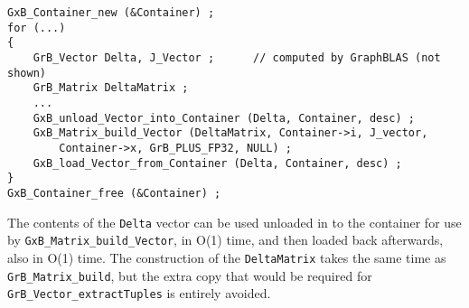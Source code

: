 {\footnotesize
\begin{verbatim}
GxB_Container_new (&Container) ;
for (...)
{
    GrB_Vector Delta, J_Vector ;      // computed by GraphBLAS (not shown)
    GrB_Matrix DeltaMatrix ;
    ...
    GxB_unload_Vector_into_Container (Delta, Container, desc) ;
    GxB_Matrix_build_Vector (DeltaMatrix, Container->i, J_vector,
        Container->x, GrB_PLUS_FP32, NULL) ;
    GxB_load_Vector_from_Container (Delta, Container, desc) ;
}
GxB_Container_free (&Container) ;
\end{verbatim}}

The contents of the \verb'Delta' vector can be used unloaded in to the
container for use by \verb'GxB_Matrix_build_Vector', in O(1) time, and then
loaded back afterwards, also in O(1) time.  The construction of the
\verb'DeltaMatrix' takes the same time as \verb'GrB_Matrix_build', but the
extra copy that would be required for \verb'GrB_Vector_extractTuples' is
entirely avoided.

